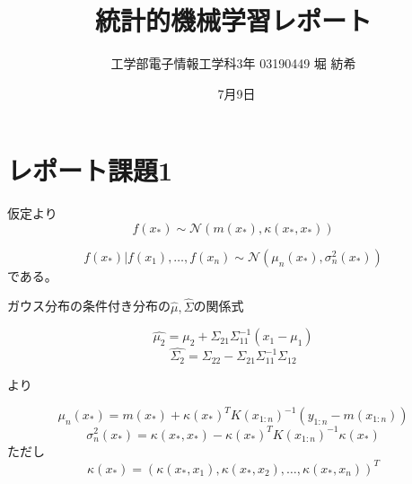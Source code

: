 \documentclass[dvipdfmx]{jsarticle}
\begin{document}
\title{統計的機械学習レポート}
\author{工学部電子情報工学科3年 03190449  堀 紡希}
\date{\ 7月9日}
\maketitle

\section{レポート課題1}


仮定より
\[f(x_{\ast}) \sim \mathscr{N}(m(x_{\ast}),\kappa(x_{\ast},x_{\ast})) \]

\[f(x_{\ast})|f(x_{1}),\dots,f(x_{n})\sim \mathscr{N}(\mu_{n}(x_{\ast}),\sigma_{n}^{2}(x_{\ast})) \]
である。

ガウス分布の条件付き分布の$\hat{\mu},\hat{\Sigma}$の関係式

\[\hat{\mu_{2}}=\mu_{2}+\Sigma_{21}\Sigma_{11}^{-1}(x_{1}-\mu_{1})\]
\[\hat{\Sigma_{2}}=\Sigma_{22}-\Sigma_{21}\Sigma_{11}^{-1}\Sigma_{12}\]

より

\[\mu_{n}(x_{\ast}) = m(x_{\ast})+\kappa(x_{\ast})^{T}K(x_{1:n})^{-1}(y_{1:n}-m(x_{1:n}))\]
\[\sigma_{n}^{2}(x_{\ast})=\kappa(x_{\ast},x_{\ast})-\kappa(x_{\ast})^{T}K(x_{1:n})^{-1}\kappa(x_{\ast})\]
ただし
\[\kappa(x_{\ast})=(\kappa(x_{\ast},x_{1}),\kappa(x_{\ast},x_{2}),\dots,\kappa(x_{\ast},x_{n}))^{T}\]
\end{document}
